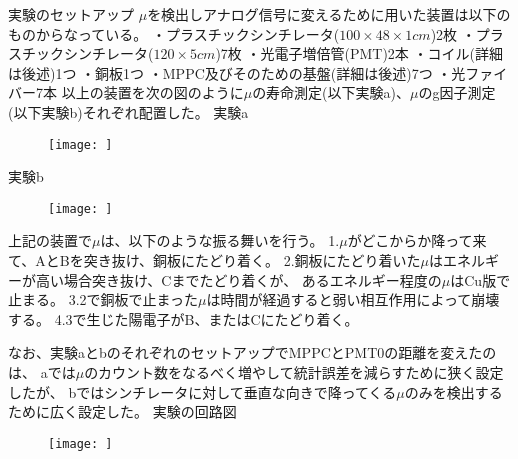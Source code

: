 実験のセットアップ
$\mu$を検出しアナログ信号に変えるために用いた装置は以下のものからなっている。
・プラスチックシンチレータ($100\times 48\times 1cm$)2枚
・プラスチックシンチレータ($120\times 5cm$)7枚
・光電子増倍管(PMT)2本
・コイル(詳細は後述)1つ
・銅板1つ
・MPPC及びそのための基盤(詳細は後述)7つ
・光ファイバー7本
以上の装置を次の図のように$\mu$の寿命測定(以下実験a)、$\mu$のg因子測定(以下実験b)それぞれ配置した。
実験a
\begin{figure}[h]
  \texttt{[image: ]}
\end{figure}
実験b
\begin{figure}[h]
  \texttt{[image: ]}
\end{figure}

上記の装置で$\mu$は、以下のような振る舞いを行う。
1.$\mu$がどこからか降って来て、AとBを突き抜け、銅板にたどり着く。
2.銅板にたどり着いた$\mu$はエネルギーが高い場合突き抜け、Cまでたどり着くが、
あるエネルギー程度の$\mu$はCu版で止まる。
3.2で銅板で止まった$\mu$は時間が経過すると弱い相互作用によって崩壊する。
4.3で生じた陽電子がB、またはCにたどり着く。

なお、実験aとbのそれぞれのセットアップでMPPCとPMT0の距離を変えたのは、
aでは$\mu$のカウント数をなるべく増やして統計誤差を減らすために狭く設定したが、
bではシンチレータに対して垂直な向きで降ってくる$\mu$のみを検出するために広く設定した。
実験の回路図
\begin{figure}[h]
  \texttt{[image: ]}
\end{figure}
